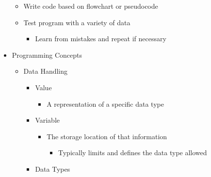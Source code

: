 \begin{itemize}
\begin{itemize}
      \item Write code based on flowchart or pseudocode

      \item Test program with a variety of data

        \begin{itemize}

          \item Learn from mistakes and repeat if necessary

        \end{itemize}

    \end{itemize}

  \item Programming Concepts

    \begin{itemize}

      \item Data Handling

        \begin{itemize}

          \item Value

            \begin{itemize}

              \item A representation of a specific data type

            \end{itemize}

          \item Variable

            \begin{itemize}

              \item The storage location of that information

                \begin{itemize}

                  \item Typically limits and defines the data type allowed

                \end{itemize}

            \end{itemize}

          \item Data Types

            \begin{itemize}


\end{itemize}
\end{itemize}
\end{itemize}
\end{itemize}
